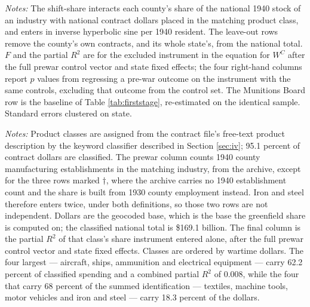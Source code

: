\documentclass[12pt]{article}
\newcommand{\textcite}[1]{\citet{#1}}
\newcommand{\fittab}[1]{%
  \sbox{\tabbox}{#1}%
  \ifdim\wd\tabbox>\textwidth
    \resizebox{\textwidth}{!}{\usebox{\tabbox}}%
  \else\usebox{\tabbox}\fi}
\begin{document}
\begin{table}[p]
\centering
\caption{A shift-share instrument against the 1938 plan}
\label{tab:shiftshare}
\fittab{}
\vspace{2pt}
\begin{minipage}{\textwidth}\footnotesize \textit{Notes:} The shift-share
interacts each county's share of the national 1940 stock of an industry with
national contract dollars placed in the matching product class, and enters in
inverse hyperbolic sine per 1940 resident. The leave-out rows remove the
county's own contracts, and its whole state's, from the national total. $F$ and
the partial $R^2$ are for the excluded instrument in the equation for $W^{C}$
after the full prewar control vector and state fixed effects; the four
right-hand columns report $p$ values from regressing a pre-war outcome on the
instrument with the same controls, excluding that outcome from the control set.
The Munitions Board row is the baseline of Table \ref{tab:firststage},
re-estimated on the identical sample. Standard errors clustered on state.
\end{minipage}
\end{table}

\begin{table}[p]
\centering
\caption{Where the shift-share gets its identification, and where the war spent its money}
\label{tab:ssclasses}
\fittab{}
\vspace{2pt}
\begin{minipage}{\textwidth}\footnotesize \textit{Notes:} Product classes are
assigned from the contract file's free-text product description by the keyword
classifier described in Section \ref{sec:iv}; 95.1 percent of contract dollars
are classified. The prewar column counts 1940 county manufacturing
establishments in the matching industry, from the \textcite{jaworski2017}
archive, except for the three rows marked $\dagger$, where the archive carries no
1940 establishment count and the share is built from 1930 county employment
instead. Iron and steel therefore enters twice, under both definitions, so those
two rows are not independent. Dollars are the geocoded base, which is the base
the greenfield share is computed on; the classified national total is
\$169.1 billion. The final column is the partial $R^2$ of that class's share
instrument entered alone, after the full prewar control vector and state fixed
effects.
Classes are ordered by wartime dollars. The four largest --- aircraft, ships,
ammunition and electrical equipment --- carry 62.2 percent of classified spending
and a combined partial $R^2$ of $0.008$, while the four that carry 68 percent of
the summed identification --- textiles, machine tools, motor vehicles and iron
and steel --- carry 18.3 percent of the dollars.
\end{minipage}
\end{table}
\end{document}

